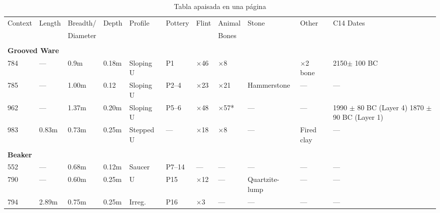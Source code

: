 \documentclass[11pt,a4paper]{article}
\begin{document}
\begin{table}
	\centering
	\caption[Ejemplo de tabla apaisada]{Tabla apaisada en una página}\label{tab:apaisada}
	\begin{tabular}{llllllllp{1in}lp{1in}}
		\toprule
		Context   &Length   &Breadth/   &Depth   &Profile   &Pottery   &Flint   &Animal   &Stone   &Other    &C14 Dates \\
		&         &Diameter   &        &          &          &        & 
		Bones&&&\\
		\midrule
		&&&&&&&&&&\\
		\multicolumn{10}{l}{\bf Grooved Ware}&\\
		784       &---        &0.9m       &0.18m   &Sloping U &P1       &$\times$46  &  $\times$8      &&       $\times$2 bone&  2150$\pm$ 100 BC\\
		785       &---        &1.00m      &0.12    &Sloping U &P2--4    &$\times$23  &  $\times$21     & Hammerstone &---&---\\
		962       &---        &1.37m      &0.20m   &Sloping U &P5--6    &$\times$48  &  $\times$57*    & ---&     ---&1990 $\pm$ 80 BC (Layer 4) 1870 $\pm$90 BC (Layer 1)\\
		983       &0.83m      &0.73m      &0.25m   &Stepped U &---      &$\times$18  &  $\times$8      & ---& Fired clay&---\\
		&&&&&&&&&&\\
		\multicolumn{10}{l}{\bf Beaker}&\\
		552       &---        &0.68m      &0.12m   &Saucer    &P7--14   &---           & ---       & ---       &---        &---\\
		790       &---        &0.60m      &0.25m   &U         &P15      &$\times$12    & ---       & Quartzite-lump&---    &---\\
		794       &2.89m      &0.75m      &0.25m   &Irreg.    &P16      &$\times$3     & ---       & ---       &---        &---\\
		\bottomrule
	\end{tabular}
\end{table}
\end{document}
